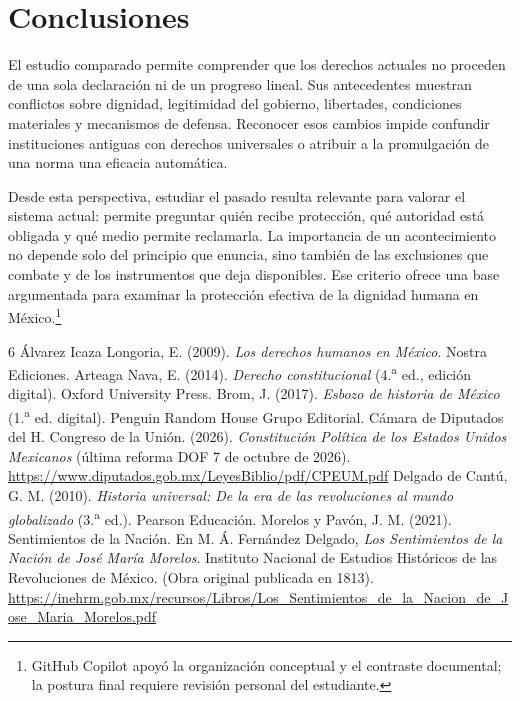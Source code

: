 \documentclass[12pt,spanish,letterpaper,oneside]{article}
\begin{document}
\section{Conclusiones}
El estudio comparado permite comprender que los derechos actuales no
proceden de una sola declaraci\'on ni de un progreso lineal. Sus antecedentes
muestran conflictos sobre dignidad, legitimidad del gobierno, libertades,
condiciones materiales y mecanismos de defensa. Reconocer esos cambios
impide confundir instituciones antiguas con derechos universales o atribuir
a la promulgaci\'on de una norma una eficacia autom\'atica.

Desde esta perspectiva, estudiar el pasado resulta relevante para valorar
el sistema actual: permite preguntar qui\'en recibe protecci\'on, qu\'e autoridad
est\'a obligada y qu\'e medio permite reclamarla. La importancia de un
acontecimiento no depende solo del principio que enuncia, sino tambi\'en
de las exclusiones que combate y de los instrumentos que deja disponibles.
Ese criterio ofrece una base argumentada para examinar la protecci\'on
efectiva de la dignidad humana en M\'exico.\footnote{GitHub Copilot apoy\'o
la organizaci\'on conceptual y el contraste documental; la postura final
requiere revisi\'on personal del estudiante.}

\clearpage
\begin{thebibliography}{6}
\'Alvarez Icaza Longoria, E. (2009). \emph{Los derechos humanos en M\'exico}. Nostra Ediciones.
Arteaga Nava, E. (2014). \emph{Derecho constitucional} (4.\textsuperscript{a} ed., edici\'on digital). Oxford University Press.
Brom, J. (2017). \emph{Esbozo de historia de M\'exico} (1.\textsuperscript{a} ed. digital). Penguin Random House Grupo Editorial.
C\'amara de Diputados del H. Congreso de la Uni\'on. (2026).
\emph{Constituci\'on Pol\'itica de los Estados Unidos Mexicanos}
(\'ultima reforma DOF 7 de octubre de 2026).
\url{https://www.diputados.gob.mx/LeyesBiblio/pdf/CPEUM.pdf}
Delgado de Cant\'u, G. M. (2010). \emph{Historia universal: De la era de las revoluciones al mundo globalizado} (3.\textsuperscript{a} ed.). Pearson Educaci\'on.
Morelos y Pav\'on, J. M. (2021). Sentimientos de la Naci\'on.
En M. \'A. Fern\'andez Delgado, \emph{Los Sentimientos de la Naci\'on de Jos\'e Mar\'ia Morelos}.
Instituto Nacional de Estudios Hist\'oricos de las Revoluciones de M\'exico.
(Obra original publicada en 1813).
\url{https://inehrm.gob.mx/recursos/Libros/Los_Sentimientos_de_la_Nacion_de_Jose_Maria_Morelos.pdf}
\end{thebibliography}
\end{document}
